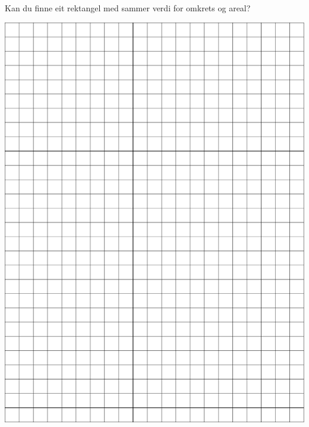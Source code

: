 \documentclass[english,openright ,hidelinks,pdftex, 12 pt,a4, class=article,crop=false]{standalone}
\begin{document}
\thispagestyle{empty}
Kan du finne eit rektangel med sammer verdi for omkrets og areal?
\begin{center}
	\includegraphics[scale=0.9]{omkr}
\end{center}

\end{document}
